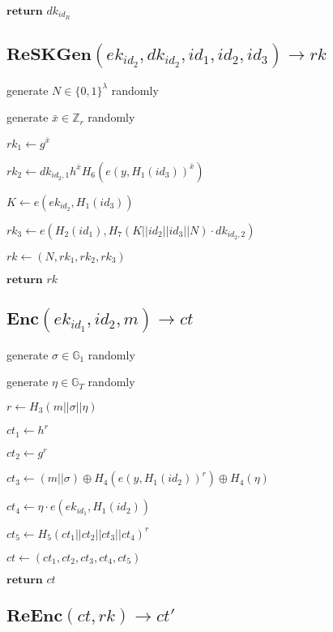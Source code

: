 \documentclass[a4paper]{article}
\begin{document}
$\textbf{return }\textit{dk}_{\textit{id}_R}$

\subsection{$\textbf{ReSKGen}(\textit{ek}_{\textit{id}_2}, \textit{dk}_{\textit{id}_2}, \textit{id}_1, \textit{id}_2, \textit{id}_3) \rightarrow \textit{rk}$}

generate $N \in \{0, 1\}^\lambda$ randomly

generate $\bar{x} \in \mathbb{Z}_r$ randomly

$\textit{rk}_1 \gets g^{\bar{x}}$

$\textit{rk}_2 \gets \textit{dk}_{\textit{id}_2, 1} h^{\bar{x}} H_6(e(y, H_1(\textit{id}_3))^{\bar{x}})$

$K \gets e(\textit{ek}_{\textit{id}_2}, H_1(\textit{id}_3))$

$\textit{rk}_3 \gets e(
H_2(\textit{id}_1), 
H_7(K || \textit{id}_2 || \textit{id}_3 || N) \cdot \textit{dk}_{\textit{id}_2, 2}
)$

$\textit{rk} \gets (N, \textit{rk}_1, \textit{rk}_2, \textit{rk}_3)$

$\textbf{return }\textit{rk}$

\subsection{$\textbf{Enc}(\textit{ek}_{\textit{id}_1}, \textit{id}_2, m) \rightarrow \textit{ct}$}

generate $\sigma \in \mathbb{G}_1$ randomly

generate $\eta \in \mathbb{G}_T$ randomly

$r \gets H_3(m || \sigma || \eta)$

$\textit{ct}_1 \gets h^r$

$\textit{ct}_2 \gets g^r$

$\textit{ct}_3 \gets (m || \sigma) \oplus H_4(e(y, H_1(\textit{id}_2))^r) \oplus H_4(\eta)$

$\textit{ct}_4 \gets \eta \cdot e(\textit{ek}_{\textit{id}_1}, H_1(\textit{id}_2))$

$\textit{ct}_5 \gets H_5(\textit{ct}_1 || \textit{ct}_2 || \textit{ct}_3 || \textit{ct}_4)^r$

$\textit{ct} \gets (\textit{ct}_1, \textit{ct}_2, \textit{ct}_3, \textit{ct}_4, \textit{ct}_5)$

$\textbf{return }\textit{ct}$

\subsection{$\textbf{ReEnc}(\textit{ct}, \textit{rk}) \rightarrow \textit{ct}'$}
\end{document}
